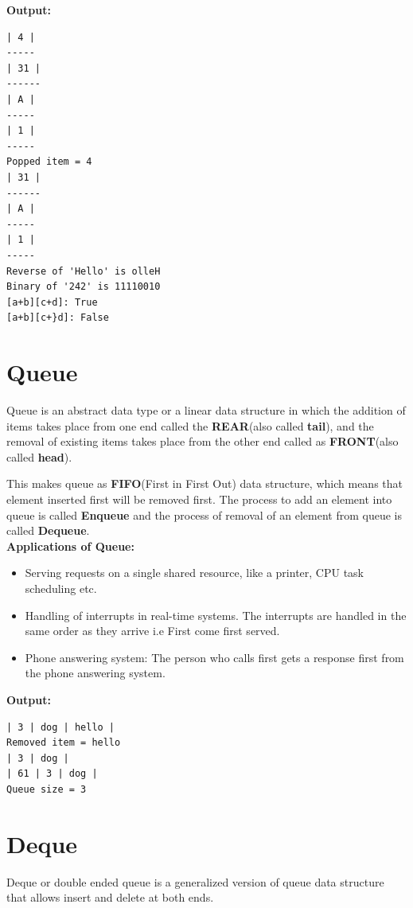 \documentclass[12pt]{article}
\begin{document}

\textbf{Output:}
\begin{lstlisting}
| 4 |
-----
| 31 |
------
| A |
-----
| 1 |
-----
Popped item = 4
| 31 |
------
| A |
-----
| 1 |
-----
Reverse of 'Hello' is olleH
Binary of '242' is 11110010
[a+b][c+d]: True
[a+b][c+}d]: False
\end{lstlisting}

\newpage
\section{Queue}
Queue is an abstract data type or a linear data structure in which the addition of items takes place from one end called the \textbf{REAR}(also called \textbf{tail}), and the removal of existing items takes place from the other end called as \textbf{FRONT}(also called \textbf{head}).

This makes queue as \textbf{FIFO}(First in First Out) data structure, which means that element inserted first will be removed first.
The process to add an element into queue is called \textbf{Enqueue} and the process of removal of an element from queue is called \textbf{Dequeue}.\\

\vspace{3mm}
\textbf{Applications of Queue:}
\begin{itemize}
	\item Serving requests on a single shared resource, like a printer, CPU task scheduling etc.
	\item Handling of interrupts in real-time systems. The interrupts are handled in the same order as they arrive i.e First come first served.
	\item Phone answering system: The person who calls first gets a response first from the phone answering system.
\end{itemize}


\textbf{Output:}
\begin{lstlisting}
| 3 | dog | hello |
Removed item = hello
| 3 | dog |
| 61 | 3 | dog |
Queue size = 3
\end{lstlisting}
\newpage

\section{Deque}
Deque or double ended queue is a generalized version of queue data structure that allows insert and delete at both ends.
\end{document}
